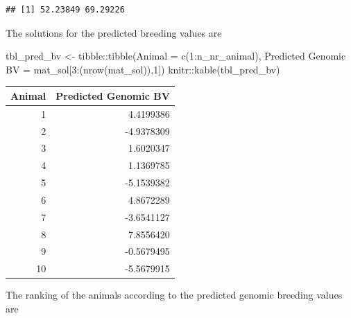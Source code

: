 \documentclass[
]{article}
\newenvironment{Shaded}{\begin{snugshade}}{\end{snugshade}}
\newcommand{\AttributeTok}[1]{\textcolor[rgb]{0.77,0.63,0.00}{#1}}
\newcommand{\ConstantTok}[1]{\textcolor[rgb]{0.00,0.00,0.00}{#1}}
\newcommand{\DecValTok}[1]{\textcolor[rgb]{0.00,0.00,0.81}{#1}}
\newcommand{\FunctionTok}[1]{\textcolor[rgb]{0.00,0.00,0.00}{#1}}
\newcommand{\NormalTok}[1]{#1}
\newcommand{\OtherTok}[1]{\textcolor[rgb]{0.56,0.35,0.01}{#1}}
\newcommand{\SpecialCharTok}[1]{\textcolor[rgb]{0.00,0.00,0.00}{#1}}
\newcommand{\StringTok}[1]{\textcolor[rgb]{0.31,0.60,0.02}{#1}}
\begin{document}
\begin{verbatim}
## [1] 52.23849 69.29226
\end{verbatim}

The solutions for the predicted breeding values are

\begin{Shaded}
\begin{Highlighting}[]
\NormalTok{tbl\_pred\_bv }\OtherTok{\textless{}{-}}\NormalTok{ tibble}\SpecialCharTok{::}\FunctionTok{tibble}\NormalTok{(}\AttributeTok{Animal =} \FunctionTok{c}\NormalTok{(}\DecValTok{1}\SpecialCharTok{:}\NormalTok{n\_nr\_animal),}
                              \StringTok{\textasciigrave{}}\AttributeTok{Predicted Genomic BV}\StringTok{\textasciigrave{}} \OtherTok{=}\NormalTok{ mat\_sol[}\DecValTok{3}\SpecialCharTok{:}\NormalTok{(}\FunctionTok{nrow}\NormalTok{(mat\_sol)),}\DecValTok{1}\NormalTok{])}
\NormalTok{knitr}\SpecialCharTok{::}\FunctionTok{kable}\NormalTok{(tbl\_pred\_bv)}
\end{Highlighting}
\end{Shaded}

\begin{longtable}[]{@{}rr@{}}
\toprule()
Animal & Predicted Genomic BV \\
\midrule()
\endhead
1 & 4.4199386 \\
2 & -4.9378309 \\
3 & 1.6020347 \\
4 & 1.1369785 \\
5 & -5.1539382 \\
6 & 4.8672289 \\
7 & -3.6541127 \\
8 & 7.8556420 \\
9 & -0.5679495 \\
10 & -5.5679915 \\
\bottomrule()
\end{longtable}

The ranking of the animals according to the predicted genomic breeding
values are

\begin{Shaded}
\end{Shaded}
\end{document}
